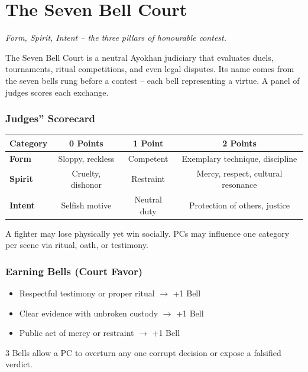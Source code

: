 \documentclass[12pt,oneside]{book}
\begin{document}
\newpage

\newpage

\appendix

\chapter{The Seven Bell Court}
\emph{Form, Spirit, Intent -- the three pillars of honourable contest.}

The Seven Bell Court is a neutral Ayokhan judiciary that evaluates duels, tournaments, ritual competitions, and even legal disputes. Its name comes from the seven bells rung before a contest -- each bell representing a virtue. A panel of judges scores each exchange.

\subsection*{Judges'' Scorecard}
\begin{longtable}{|l|c|c|c|}
\hline
\textbf{Category} & \textbf{0 Points} & \textbf{1 Point} & \textbf{2 Points} \\
\hline
\textbf{Form} & Sloppy, reckless & Competent & Exemplary technique, discipline \\
\hline
\textbf{Spirit} & Cruelty, dishonor & Restraint & Mercy, respect, cultural resonance \\
\hline
\textbf{Intent} & Selfish motive & Neutral duty & Protection of others, justice \\
\hline
\end{longtable}

A fighter may lose physically yet win socially. PCs may influence one category per scene via ritual, oath, or testimony.

\subsection*{Earning Bells (Court Favor)}
\begin{itemize}
  \item Respectful testimony or proper ritual $\rightarrow$ +1 Bell
  \item Clear evidence with unbroken custody $\rightarrow$ +1 Bell
  \item Public act of mercy or restraint $\rightarrow$ +1 Bell
\end{itemize}
3 Bells allow a PC to overturn any one corrupt decision or expose a falsified verdict.
\end{document}
